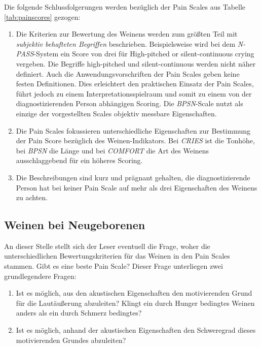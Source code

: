 Die folgende Schlussfolgerungen werden bezüglich der Pain Scales aus Tabelle \ref{tab:painscores} gezogen:

\begin{enumerate}
	
	\item Die Kriterien zur Bewertung des Weinens werden zum größten Teil mit \emph{subjektiv behafteten Begriffen} beschrieben. Beispielsweise wird bei dem \emph{N-PASS}-System ein Score von drei für \glqq High-pitched or silent-continuous crying\grqq{} vergeben. Die Begriffe \glqq high-pitched\grqq{} und \glqq silent-continuous\grqq{} werden nicht näher definiert.  Auch die Anwendungsvorschriften der Pain Scales geben keine festen Definitionen. Dies erleichtert den praktischen Einsatz der Pain Scales, führt jedoch zu einem Interpretationsspielraum und somit zu einem von der diagnostizierenden Person abhängigen Scoring. Die \emph{BPSN}-Scale nutzt als einzige der vorgestellten Scales objektiv messbare Eigenschaften. 
	
	\item Die Pain Scales fokussieren unterschiedliche Eigenschaften zur Bestimmung der Pain Score bezüglich des Weinen-Indikators. Bei \emph{CRIES} ist die Tonhöhe, bei \emph{BPSN} die Länge und bei \emph{COMFORT} die Art des Weinens ausschlaggebend für ein höheres Scoring.
	
	\item Die Beschreibungen sind kurz und prägnant gehalten, die diagnostizierende Person hat bei keiner Pain Scale auf mehr als drei Eigenschaften des Weinens zu achten.
\end{enumerate}


\subsection{Weinen bei Neugeborenen}
\label{sec:foundations_cryingMeta}

An dieser Stelle stellt sich der Leser eventuell die Frage, woher die unterschiedlichen Bewertungskriterien für das Weinen in den Pain Scales stammen. Gibt es eine \glqq beste\grqq{} Pain Scale? Dieser Frage unterliegen zwei grundlegendere Fragen:

\begin{enumerate}
	\item Ist es möglich, aus den akustischen Eigenschaften den motivierenden Grund für die Lautäußerung abzuleiten?  Klingt ein durch Hunger bedingtes Weinen anders als ein durch Schmerz bedingtes?
	\item Ist es möglich, anhand der akustischen Eigenschaften den Schweregrad dieses motivierenden Grundes abzuleiten?
\end{enumerate}

